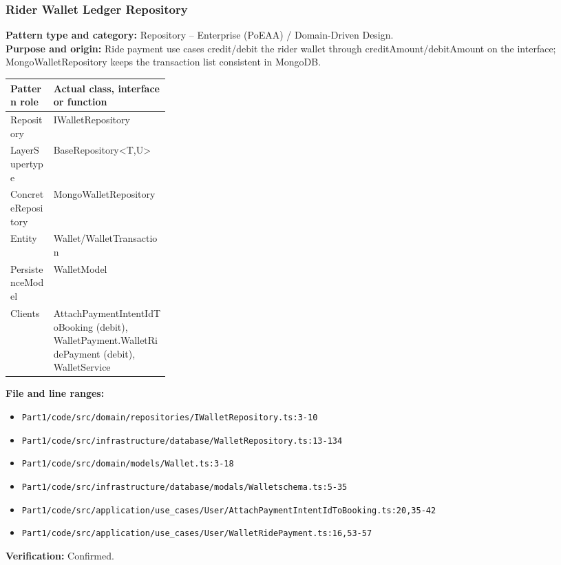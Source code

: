 \documentclass[11pt,a4paper]{article}
\begin{document}
\subsubsection*{Rider Wallet Ledger Repository}
\textbf{Pattern type and category:} Repository -- Enterprise (PoEAA) / Domain-Driven Design.\\
\textbf{Purpose and origin:} Ride payment use cases credit/debit the rider wallet through creditAmount/debitAmount on the interface; MongoWalletRepository keeps the transaction list consistent in MongoDB.

\noindent\begin{tabularx}{\linewidth}{@{}P{0.27\linewidth}Y@{}}
\toprule Pattern role & Actual class, interface or function \\ \midrule
Repository & IWalletRepository \\
LayerSupertype & BaseRepository\textless{}T,U\textgreater{} \\
ConcreteRepository & MongoWalletRepository \\
Entity & Wallet/WalletTransaction \\
PersistenceModel & WalletModel \\
Clients & AttachPaymentIntentIdToBooking (debit), WalletPayment.WalletRidePayment (debit), WalletService \\
\bottomrule
\end{tabularx}

\noindent\textbf{File and line ranges:}\begin{itemize}\setlength\itemsep{0pt}\item \texttt{Part1/\allowbreak{}code/\allowbreak{}src/\allowbreak{}domain/\allowbreak{}repositories/\allowbreak{}IWalletRepository.\allowbreak{}ts:3-10}\item \texttt{Part1/\allowbreak{}code/\allowbreak{}src/\allowbreak{}infrastructure/\allowbreak{}database/\allowbreak{}WalletRepository.\allowbreak{}ts:13-134}\item \texttt{Part1/\allowbreak{}code/\allowbreak{}src/\allowbreak{}domain/\allowbreak{}models/\allowbreak{}Wallet.\allowbreak{}ts:3-18}\item \texttt{Part1/\allowbreak{}code/\allowbreak{}src/\allowbreak{}infrastructure/\allowbreak{}database/\allowbreak{}modals/\allowbreak{}Walletschema.\allowbreak{}ts:5-35}\item \texttt{Part1/\allowbreak{}code/\allowbreak{}src/\allowbreak{}application/\allowbreak{}use\_\allowbreak{}cases/\allowbreak{}User/\allowbreak{}AttachPaymentIntentIdToBooking.\allowbreak{}ts:20,35-42}\item \texttt{Part1/\allowbreak{}code/\allowbreak{}src/\allowbreak{}application/\allowbreak{}use\_\allowbreak{}cases/\allowbreak{}User/\allowbreak{}WalletRidePayment.\allowbreak{}ts:16,53-57}\end{itemize}
\noindent\textbf{Verification:} Confirmed.
\end{document}
